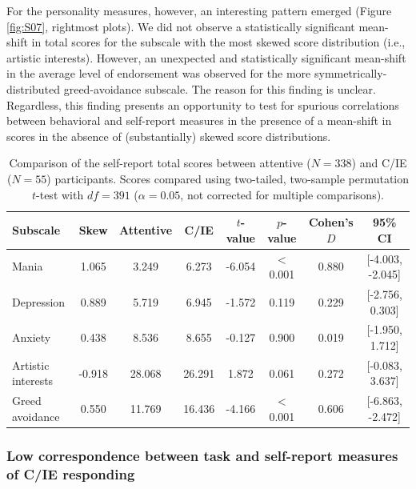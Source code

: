 \documentclass[a4paper,notitlepage,12pt]{article}
\begin{document}
For the personality measures, however, an interesting pattern emerged (Figure \ref{fig:S07}, rightmost plots). We did not observe a statistically significant mean-shift in total scores for the subscale with the most skewed score distribution (i.e., artistic interests). However, an unexpected and statistically significant mean-shift in the average level of endorsement was observed for the more symmetrically-distributed greed-avoidance subscale. The reason for this finding is unclear. Regardless, this finding presents an opportunity to test for spurious correlations between behavioral and self-report measures in the presence of a mean-shift in scores in the absence of (substantially) skewed score distributions. 

\begin{table}[!t]
    \centering
    \small
    \begin{tabular}{lccccccc}
        \toprule
        Subscale & Skew &  Attentive & C/IE & $t$-value & $p$-value & Cohen's $D$ & 95\% CI \\
        \midrule
        Mania                &  1.065 &      3.249 &   6.273 & -6.054 &  $<$0.001 &  0.880 &  [-4.003, -2.045] \\
        Depression           &  0.889 &      5.719 &   6.945 & -1.572 &  0.119 &  0.229 &   [-2.756, 0.303] \\
        Anxiety              &  0.438 &      8.536 &   8.655 & -0.127 &  0.900 &  0.019 &   [-1.950, 1.712] \\
        Artistic interests   & -0.918 &     28.068 &  26.291 &  1.872 &  0.061 &  0.272 &   [-0.083, 3.637] \\
        Greed avoidance      &  0.550 &     11.769 &  16.436 & -4.166 &  $<$0.001 &  0.606 &  [-6.863, -2.472] \\
        \bottomrule
    \end{tabular}
    \caption{Comparison of the self-report total scores between attentive ($N=338$) and C/IE ($N=55$) participants. Scores compared using two-tailed, two-sample permutation $t$-test with $df=391$ ($\alpha = 0.05$, not corrected for multiple comparisons).}    
    \label{tab:S11}
\end{table}

\subsubsection*{Low correspondence between task and self-report measures of C/IE responding}
\end{document}
